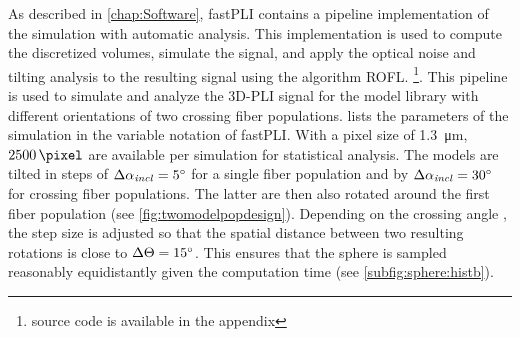 %
As described in \cref{chap:Software}, \ac{fastPLI} contains a pipeline implementation of the simulation with automatic analysis.
This implementation is used to compute the discretized volumes, simulate the signal, and apply the optical noise and tilting analysis to the resulting signal using the algorithm \ac{ROFL}. \footnote{source code is available in the appendix \dummy{}}.
This pipeline is used to simulate and analyze the \ac{3D-PLI} signal for the model library with different orientations of two crossing fiber populations.
 lists the parameters of the simulation in the variable notation of \ac{fastPLI}.
With a pixel size of \SI{1.3}{\micro\meter}, $\SI{2500}{\pixel}$ are available per simulation for statistical analysis.
The models are tilted in steps of $\Delta \textnormal{$\alpha_{\mathit{incl}}$} = \SI{5}{\degree}$ for a single fiber population and by $\Delta \textnormal{$\alpha_{\mathit{incl}}$} = \SI{30}{\degree}$ for crossing fiber populations. The latter are then also rotated around the first fiber population (see \cref{fig:twomodelpopdesign}).
Depending on the crossing angle \modelOmega{}, the step size is adjusted so that the spatial distance between two resulting rotations is close to $\Delta \textnormal{$\Theta$} = \SI{15}{\degree}$.
This ensures that the sphere is sampled reasonably equidistantly given the computation time (see \cref{subfig:sphere:histb}).
%
%
%
